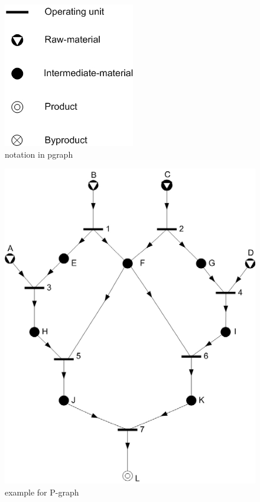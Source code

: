 \begin{minipage}{0.5\textwidth}
	\begin{figure}[H]
	\centering 
	\includegraphics[scale=0.6]{ch2/img/notationP}
	\caption{\label{fig:notation in pgraph}notation in pgraph\cite{pns2}}
	\end{figure}\end{minipage} \hfill
\begin{minipage}{0.45\textwidth}
	\begin{figure}[H]
	\includegraphics[scale=0.4]{ch2/img/examplePgraph}
	\caption{\label{fig:example for P-graph}example for P-graph\cite{pns2}}
	\end{figure}
\end{minipage}

